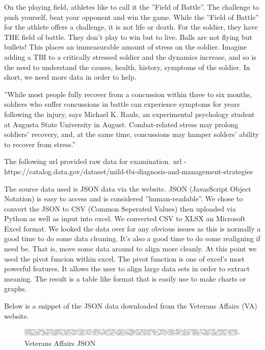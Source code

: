 \documentclass[sigconf]{acmart}
\begin{document}
On the playing field, athletes like to call it the ''Field of Battle''.  The challenge to push yourself, beat your opponent and win the game.  While the ''Field of Battle'' for the athlete offers a challenge, it is not life or death.  For the soldier, they have THE field of battle.  They don't play to win but to live.  Balls are not flying but bullets!  This places an immeasurable amount of stress on the soldier.  Imagine adding a TBI to a critically stressed soldier and the dynamics increase, and so is the need to understand the causes, health, history, symptoms of the soldier.  In short, we need more data in order to help.

''While most people fully recover from a concussion within three to six months, soldiers who suffer concussions in battle can experience symptoms for years following the injury, says Michael K. Rauls, an experimental psychology student at Augusta State University in August.  Combat-related stress may prolong soldiers' recovery, and, at the same time, concussions may hamper solders' ability to recover from stress.''\cite{www-apa-org}

The following url provided raw data for examination.
url - https://catalog.data.gov/dataset/mild-tbi-diagnosis-and-management-strategies 
\cite{www-catalog-data-gov}

The source data used is JSON data via the website.  JSON (JavasScript Object Notation) is easy to access and is considered ''human-readable''.  We chose to convert the JSON to CSV (Common Seperated Values) then uploaded via Python as well as input into excel. We converted CSV to XLSX an Microsoft Excel format.  We looked the data over for any obvious issues as this is normally a good time to do some data cleaning.  It's also a good time to do some realigning if need be.  That is, move some data around to align more cleanly.  At this point we used the pivot funcion within excel.  The pivot function is one of excel's most powerful features.  It allows the user to align large data sets in order to extract meaning.  The result is a table like format that is easily use to make charts or graphs. 

Below is a snippet of the JSON data downloaded from the Veterans Affairs (VA) website.  


\begin{figure}[h]
\includegraphics[width=\columnwidth]{images/graph2.png}
\caption{Veterans Affairs JSON}\label{f:Veterans Affairs JSON}
\end{figure}
\end{document}
